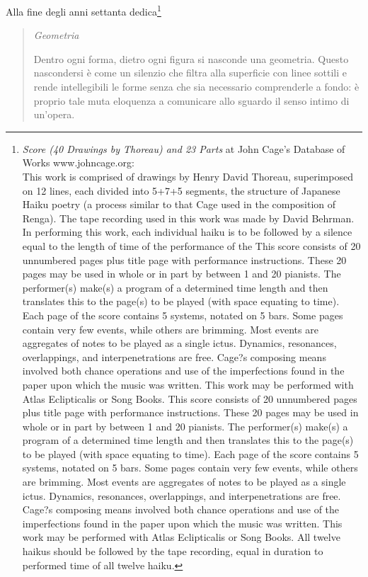 \begin{multicols}{2}
Alla fine degli anni settanta dedica\footnote{\emph{Score (40 Drawings by Thoreau) and 23 Parts} at John Cage's Database of Works www.johncage.org:\\ This work is comprised of drawings by Henry David Thoreau, superimposed on 12 lines, each divided into 5+7+5 segments, the structure of Japanese Haiku poetry (a process similar to that Cage used in the composition of Renga). The tape recording used in this work was made by David Behrman. In performing this work, each individual haiku is to be followed by a silence equal to the length of time of the performance of the This score consists of 20 unnumbered pages plus title page with performance instructions. These 20 pages may be used in whole or in part by between 1 and 20 pianists. The performer(s) make(s) a program of a determined time length and then translates this to the page(s) to be played (with space equating to time). Each page of the score contains 5 systems, notated on 5 bars. Some pages contain very few events, while others are brimming. Most events are aggregates of notes to be played as a single ictus. Dynamics, resonances, overlappings, and interpenetrations are free. Cage?s composing means involved both chance operations and use of the imperfections found in the paper upon which the music was written. This work may be performed with Atlas Eclipticalis or Song Books. This score consists of 20 unnumbered pages plus title page with performance instructions. These 20 pages may be used in whole or in part by between 1 and 20 pianists. The performer(s) make(s) a program of a determined time length and then translates this to the page(s) to be played (with space equating to time). Each page of the score contains 5 systems, notated on 5 bars. Some pages contain very few events, while others are brimming. Most events are aggregates of notes to be played as a single ictus. Dynamics, resonances, overlappings, and interpenetrations are free. Cage?s composing means involved both chance operations and use of the imperfections found in the paper upon which the music was written. This work may be performed with Atlas Eclipticalis or Song Books. All twelve haikus should be followed by the tape recording, equal in duration to performed time of all twelve haiku.}

\begin{quote}
	\emph{Geometria}

	Dentro ogni forma, dietro ogni figura si nasconde una geometria. Questo nascondersi \`e come
	un silenzio che filtra alla superficie con linee sottili e rende intellegibili le forme
	senza che sia necessario comprenderle a fondo: \`e proprio tale muta eloquenza a comunicare
	allo sguardo il senso intimo di un'opera.


\end{quote}
\end{multicols}
